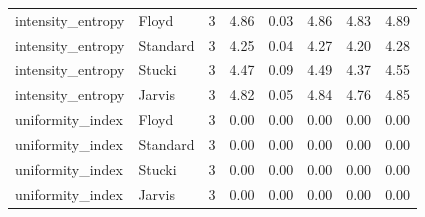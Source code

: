 \begin{tabular}{llrlllll}
intensity_entropy & Floyd & 3 & 4.86 & 0.03 & 4.86 & 4.83 & 4.89 \\
intensity_entropy & Standard & 3 & 4.25 & 0.04 & 4.27 & 4.20 & 4.28 \\
intensity_entropy & Stucki & 3 & 4.47 & 0.09 & 4.49 & 4.37 & 4.55 \\
intensity_entropy & Jarvis & 3 & 4.82 & 0.05 & 4.84 & 4.76 & 4.85 \\
uniformity_index & Floyd & 3 & 0.00 & 0.00 & 0.00 & 0.00 & 0.00 \\
uniformity_index & Standard & 3 & 0.00 & 0.00 & 0.00 & 0.00 & 0.00 \\
uniformity_index & Stucki & 3 & 0.00 & 0.00 & 0.00 & 0.00 & 0.00 \\
uniformity_index & Jarvis & 3 & 0.00 & 0.00 & 0.00 & 0.00 & 0.00 \\
\bottomrule
\end{tabular}
